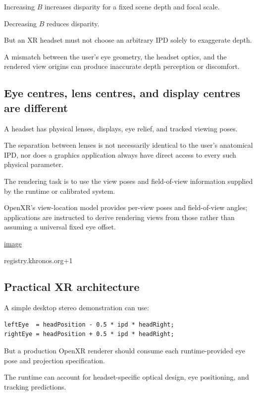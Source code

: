 Increasing \(B\) increases disparity for a fixed scene depth and focal scale.

Decreasing \(B\) reduces disparity.

But an XR headset must not choose an arbitrary IPD solely to exaggerate depth.

A mismatch between the user's eye geometry, the headset optics, and the rendered view origins can produce inaccurate depth perception or discomfort.

\subsection{Eye centres, lens centres, and display centres are different}\label{02-foundations-ii-ch035-eye-centres-lens-centres-and-display-centres-are-different}

A headset has physical lenses, displays, eye relief, and tracked viewing poses.

The separation between lenses is not necessarily identical to the user's anatomical IPD, nor does a graphics application always have direct access to every such physical parameter.

The rendering task is to use the view poses and field-of-view information supplied by the runtime or calibrated system.

OpenXR's view-location model provides per-view poses and field-of-view angles; applications are instructed to derive rendering views from those rather than assuming a universal fixed eye offset. 

\href{https://www.google.com/s2/favicons?domain=https://registry.khronos.org&sz=32}{image}

registry.khronos.org+1

\subsection{Practical XR architecture}\label{02-foundations-ii-ch035-practical-xr-architecture}

A simple desktop stereo demonstration can use:

\begin{verbatim}
leftEye  = headPosition - 0.5 * ipd * headRight;
rightEye = headPosition + 0.5 * ipd * headRight;
\end{verbatim}

But a production OpenXR renderer should consume each runtime-provided eye pose and projection specification.

The runtime can account for headset-specific optical design, eye positioning, and tracking predictions.

